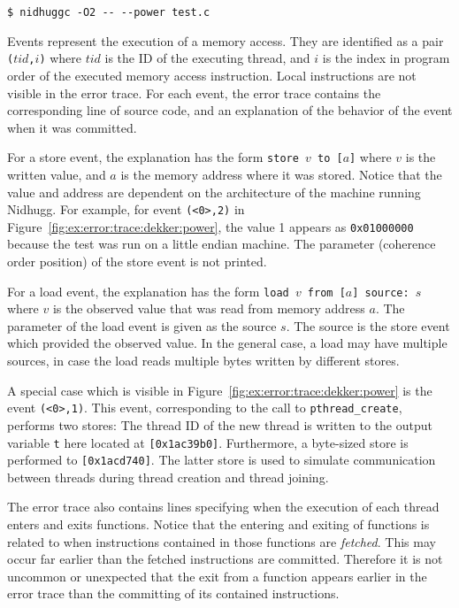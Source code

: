 \documentclass[a4paper]{article}
\begin{document}
\noindent
\begin{verbatim}
$ nidhuggc -O2 -- --power test.c
\end{verbatim}

\noindent
Events represent the execution of a memory access. They are identified
as a pair \texttt{($tid$,$i$)} where $tid$ is the ID of the executing
thread, and $i$ is the index in program order of the executed memory
access instruction. Local instructions are not visible in the error
trace. For each event, the error trace contains the corresponding line
of source code, and an explanation of the behavior of the event when
it was committed.

For a store event, the explanation has the form
\texttt{store~$v$~to~[$a$]} where $v$ is the written value, and $a$ is
the memory address where it was stored. Notice that the value and
address are dependent on the architecture of the machine running
Nidhugg. For example, for event \texttt{(<0>,2)} in
Figure~\ref{fig:ex:error:trace:dekker:power}, the value 1 appears as
\texttt{0x01000000} because the test was run on a little endian
machine. The parameter (coherence order position) of the store event
is not printed.

For a load event, the explanation has the form
\texttt{load~$v$~from~[$a$]~source:~$s$} where $v$ is the observed
value that was read from memory address $a$. The parameter of the load
event is given as the source $s$. The source is the store event which
provided the observed value. In the general case, a load may have
multiple sources, in case the load reads multiple bytes written by
different stores.

A special case which is visible in
Figure~\ref{fig:ex:error:trace:dekker:power} is the event
\texttt{(<0>,1)}. This event, corresponding to the call to
\texttt{pthread\_create}, performs two stores: The thread ID of the
new thread is written to the output variable \texttt{t} here located
at \texttt{[0x1ac39b0]}. Furthermore, a byte-sized store is performed
to \texttt{[0x1acd740]}. The latter store is used to simulate
communication between threads during thread creation and thread
joining.

The error trace also contains lines specifying when the execution of
each thread enters and exits functions. Notice that the entering and
exiting of functions is related to when instructions contained in
those functions are \emph{fetched}. This may occur far earlier than
the fetched instructions are committed. Therefore it is not uncommon
or unexpected that the exit from a function appears earlier in the
error trace than the committing of its contained instructions.
\end{document}
